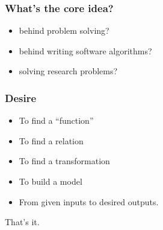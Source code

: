 

\begin{frame}[fragile]\frametitle{What's the core idea?}
\begin{itemize}
\item behind problem solving?
\item behind writing software algorithms?
\item solving research problems?
\end{itemize}
\end{frame}

\begin{frame}[fragile]\frametitle{Desire}
\begin{itemize}
\item To find a ``function''
\item To find a relation
\item To find a transformation
\item To build a model
\item From given inputs to desired outputs.
\end{itemize}
That's it.
\end{frame}

